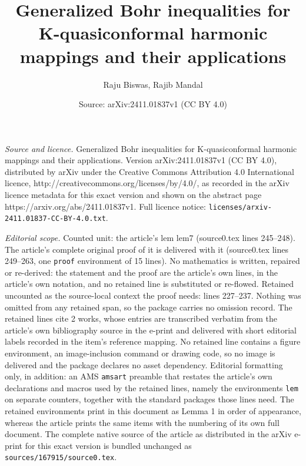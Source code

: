 \documentclass[10pt,a4paper]{amsart}
\title{Generalized Bohr inequalities for K-quasiconformal harmonic mappings and their applications}
\author{Raju Biswas, Rajib Mandal}
\date{Source: arXiv:2411.01837v1 (CC BY 4.0)}
\begin{document}
\maketitle

\noindent\emph{Source and licence.} Generalized Bohr inequalities for K-quasiconformal harmonic mappings and their applications. Version arXiv:2411.01837v1 (CC BY 4.0), distributed by arXiv under the Creative Commons Attribution 4.0 International licence, http://creativecommons.org/licenses/by/4.0/, as recorded in the arXiv licence metadata for this exact version and shown on the abstract page https://arxiv.org/abs/2411.01837v1. Full licence notice: \texttt{licenses/arxiv-2411.01837-CC-BY-4.0.txt}.\par\smallskip

\noindent\textit{Editorial scope.} Counted unit: the article's lem lem7 (source0.tex lines 245--248). The article's complete original proof of it is delivered with it (source0.tex lines 249--263, one \texttt{proof} environment of 15 lines). No mathematics is written, repaired or re-derived: the statement and the proof are the article's own lines, in the article's own notation, and no retained line is substituted or re-flowed.  Retained uncounted as the source-local context the proof needs: lines 227--237.  Nothing was omitted from any retained span, so the package carries no omission record.  The retained lines cite 2 works, whose entries are transcribed verbatim from the article's own bibliography source in the e-print and delivered with short editorial labels recorded in the item's reference mapping.  No retained line contains a figure environment, an image-inclusion command or drawing code, so no image is delivered and the package declares no asset dependency.  Editorial formatting only, in addition: an AMS \texttt{amsart} preamble that restates the article's own declarations and macros used by the retained lines, namely the environments \texttt{lem} on separate counters, together with the standard packages those lines need.  The retained environments print in this document as Lemma 1 in order of appearance, whereas the article prints the same items with the numbering of its own full document.  The complete native source of the article as distributed in the arXiv e-print for this exact version is bundled unchanged as \texttt{sources/167915/source0.tex}.
\end{document}

